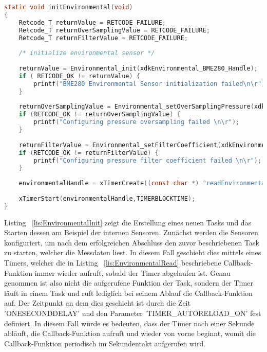 \begin{lstlisting}[language=C, caption={Task-Initialisierung: Interne Sensoren}, label=lis:EnvironmentalInit]
static void initEnvironmental(void)
{
	Retcode_T returnValue = RETCODE_FAILURE;
	Retcode_T returnOverSamplingValue = RETCODE_FAILURE;
	Retcode_T returnFilterValue = RETCODE_FAILURE;
	
	/* initialize environmental sensor */
	
	returnValue = Environmental_init(xdkEnvironmental_BME280_Handle);
	if ( RETCODE_OK != returnValue) {
		printf("BME280 Environmental Sensor initialization failed\n\r");
	}
	
	returnOverSamplingValue = Environmental_setOverSamplingPressure(xdkEnvironmental_BME280_Handle,ENVIRONMENTAL_BME280_OVERSAMP_2X);
	if (RETCODE_OK != returnOverSamplingValue) {
		printf("Configuring pressure oversampling failed \n\r");
	}
	
	returnFilterValue = Environmental_setFilterCoefficient(xdkEnvironmental_BME280_Handle,ENVIRONMENTAL_BME280_FILTER_COEFF_2);
	if (RETCODE_OK != returnFilterValue) {
		printf("Configuring pressure filter coefficient failed \n\r");
	}
	
	environmentalHandle = xTimerCreate((const char *) "readEnvironmental", ONESECONDDELAY,TIMER_AUTORELOAD_ON, NULL, readEnvironmental);
	
	xTimerStart(environmentalHandle,TIMERBLOCKTIME);
}
\end{lstlisting}
Listing ~\ref{lis:EnvironmentalInit} zeigt die Erstellung eines neuen Tasks und das Starten dessen am Beispiel der internen Sensoren. Zunächst werden die Sensoren konfiguriert, um nach dem erfolgreichen Abschluss den zuvor beschriebenen Task zu starten, welcher die Messdaten liest. \newline 
In diesem Fall geschieht dies mittels eines Timers, welcher die in Listing ~\ref{lis:EnvironmentalRead} beschriebene Callback-Funktion immer wieder aufruft, sobald der Timer abgelaufen ist. Genau genommen ist also nicht die aufgerufene Funktion der Task, sondern der Timer läuft in einem Task und ruft lediglich bei seinem Ablauf die Callback-Funktion auf. \newline
Der Zeitpunkt an dem dies geschieht ist durch die Zeit 'ONESECONDDELAY' und den Parameter 'TIMER\_AUTORELOAD\_ON' fest definiert. In diesem Fall würde es bedeuten, dass der Timer nach einer Sekunde abläuft, die Callback-Funktion aufruft und wieder von vorne beginnt, womit die Callback-Funktion periodisch im Sekundentakt aufgerufen wird.



